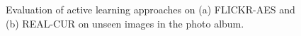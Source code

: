 \documentclass[10pt,twocolumn,letterpaper]{article}
\begin{document}
\begin{figure}
\begin{center}
\end{center}
\vspace{-0.1in}
\caption{Evaluation of active learning approaches on (a) FLICKR-AES and (b) REAL-CUR on unseen images in the photo album. 
\vspace{-0.15in}
\label{fig:testresults2}}
\end{figure}



\endgroup


{\small


}
\end{document}
